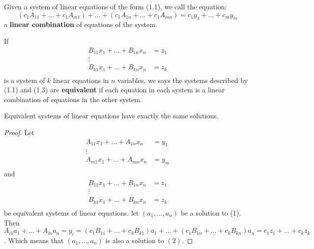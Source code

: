 \begin{definition}
    Given a system of linear equations of the form (1.1), we call the equation:
        \begin{equation}
            (c_1A_{11}+\dots+c_1A_{m1})+\dots+(c_1A_{1n}+\dots+c_1A_{mn})=c_1y_1+\dots+c_my_m
        \end{equation}
    a \textbf{linear combination} of equations of the system.
\end{definition}

\begin{definition}
    If
        \begin{equation}
            \begin{align}
                B_{11}x_1+ \dots+B_{1n}x_n &= z_1 \\
                \vdots & \\
                B_{k1}x_1+ \dots+B_{kn}x_n &= z_k \\
            \end{align}
        \end{equation}
        is a system of $k$ linear equations in  $n$ variables, we says the systems described by
        (1.1) and (1.3) are \textbf{equivalent} if each equation in each system is a linear
        combination of equations in the other system.
\end{definition}

\begin{theorem}\label{1.1.1}
    Equivalent systems of linear equations have exactly the same solutions.
\end{theorem}
\begin{proof}
    Let 
    \begin{equation}\tag{1}
            \begin{align}
                A_{11}x_1+\dots+A_{1n}x_n &= y_1 \\
                        \vdots             \\
                A_{m1}x_1+\dots+A_{mn}x_n &= y_m \\
            \end{align}
    \end{equation}
    and
        \begin{equation}\tag{2}
            \begin{align}
                B_{11}x_1+ \dots+B_{1n}x_n &= z_1 \\
                \vdots & \\
                B_{k1}x_1+ \dots+B_{kn}x_n &= z_k \\
            \end{align}
        \end{equation}
        be equivalent systems of linear equations. let $(a_1, \dots, a_n)$ be a solution to (1).
        Then $A_{i1}a_1+\dots+A_{in}a_n =
        y_i=(c_1B_{11}+\dots+c_kB_{k1})a_1+\dots+(c_1B_{1n}+\dots+c_kB_{kn})a_n=c_1z_1+\dots+c_kz_k$.
        Which means that $(a_1, \dots, a_n)$ is also a solution to $(2)$.
\end{proof}
